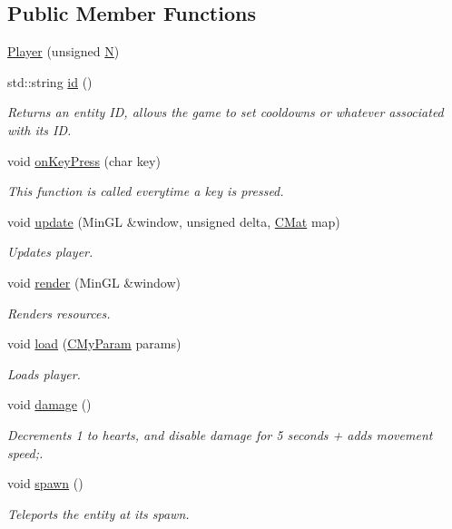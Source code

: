 \subsection*{Public Member Functions}
\begin{DoxyCompactItemize}
\item 
\hyperlink{classns_game_1_1_player_a3b9991c6a7a1f910ab53a4e9fd1eb1f9}{Player} (unsigned \hyperlink{classns_game_1_1_player_a6fc5b1fa9ec5ca495fedf4908942d2f0}{N})
\item 
std\+::string \hyperlink{classns_game_1_1_player_a339da658eb7a76de90ac66ec5cde929b}{id} ()
\begin{DoxyCompactList}\small\item\em Returns an entity ID, allows the game to set cooldowns or whatever associated with its ID. \end{DoxyCompactList}\item 
void \hyperlink{classns_game_1_1_player_a6633913bc19fdca8616b29ee265f7b28}{on\+Key\+Press} (char key)
\begin{DoxyCompactList}\small\item\em This function is called everytime a key is pressed. \end{DoxyCompactList}\item 
void \hyperlink{classns_game_1_1_player_a8702d56a2f8651a53511b4dbea30d0f6}{update} (Min\+GL \&window, unsigned delta, \hyperlink{type_8h_a64a592133575ccebb1b36453acbec02b}{C\+Mat} map)
\begin{DoxyCompactList}\small\item\em Updates player. \end{DoxyCompactList}\item 
void \hyperlink{classns_game_1_1_player_a34b359a72d3dbdf537c72161898376f3}{render} (Min\+GL \&window)
\begin{DoxyCompactList}\small\item\em Renders resources. \end{DoxyCompactList}\item 
void \hyperlink{classns_game_1_1_player_a279b6cf908ceeb398d99d8cd1e02fa56}{load} (\hyperlink{struct_c_my_param}{C\+My\+Param} params)
\begin{DoxyCompactList}\small\item\em Loads player. \end{DoxyCompactList}\item 
void \hyperlink{classns_game_1_1_player_a6593cce5f194289c251eba839972aaac}{damage} ()
\begin{DoxyCompactList}\small\item\em Decrements 1 to hearts, and disable damage for 5 seconds + adds movement speed;. \end{DoxyCompactList}\item 
void \hyperlink{classns_game_1_1_player_acab2fb26d3c0dddadccf7fcfc17b6e79}{spawn} ()
\begin{DoxyCompactList}\small\item\em Teleports the entity at its spawn. \end{DoxyCompactList}\end{DoxyCompactItemize}
